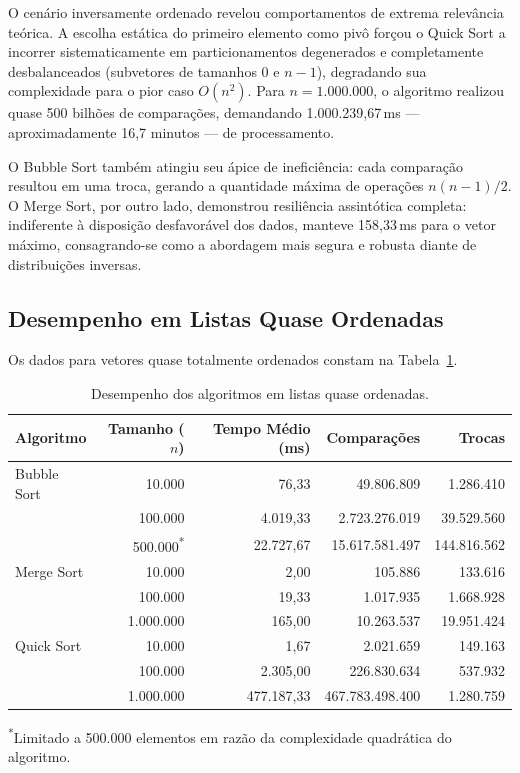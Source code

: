 \documentclass[12pt]{article}
\begin{document}
O cenário inversamente ordenado revelou comportamentos de extrema relevância
teórica. A escolha estática do primeiro elemento como pivô forçou o Quick
Sort a incorrer sistematicamente em particionamentos degenerados e
completamente desbalanceados (subvetores de tamanhos $0$ e $n-1$), degradando
sua complexidade para o pior caso $O(n^2)$. Para $n = 1.000.000$, o
algoritmo realizou quase 500 bilhões de comparações, demandando
1.000.239,67\,ms — aproximadamente 16,7 minutos — de processamento.

O Bubble Sort também atingiu seu ápice de ineficiência: cada comparação
resultou em uma troca, gerando a quantidade máxima de operações
$n(n-1)/2$. O Merge Sort, por outro lado, demonstrou resiliência assintótica
completa: indiferente à disposição desfavorável dos dados, manteve
158,33\,ms para o vetor máximo, consagrando-se como a abordagem mais segura
e robusta diante de distribuições inversas.

\subsection{Desempenho em Listas Quase Ordenadas}

Os dados para vetores quase totalmente ordenados constam na
Tabela~\ref{tab:quase}.

\begin{table}[ht]
\centering
\caption{Desempenho dos algoritmos em listas quase ordenadas.}
\label{tab:quase}
\begin{tabular}{l r r r r}
\toprule
\textbf{Algoritmo} & \textbf{Tamanho ($n$)} &
  \textbf{Tempo Médio (ms)} & \textbf{Comparações} & \textbf{Trocas} \\
\midrule
Bubble Sort & 10.000    & 76,33       & 49.806.809      & 1.286.410       \\
            & 100.000   & 4.019,33    & 2.723.276.019   & 39.529.560      \\
            & 500.000\textsuperscript{*}
                        & 22.727,67   & 15.617.581.497  & 144.816.562     \\
\midrule
Merge Sort  & 10.000    & 2,00        & 105.886         & 133.616         \\
            & 100.000   & 19,33       & 1.017.935       & 1.668.928       \\
            & 1.000.000 & 165,00      & 10.263.537      & 19.951.424      \\
\midrule
Quick Sort  & 10.000    & 1,67        & 2.021.659       & 149.163         \\
            & 100.000   & 2.305,00    & 226.830.634     & 537.932         \\
            & 1.000.000 & 477.187,33  & 467.783.498.400 & 1.280.759       \\
\bottomrule
\end{tabular}
\begin{flushleft}
\footnotesize \textsuperscript{*}Limitado a 500.000 elementos em razão da
complexidade quadrática do algoritmo.
\end{flushleft}
\end{table}
\end{document}
